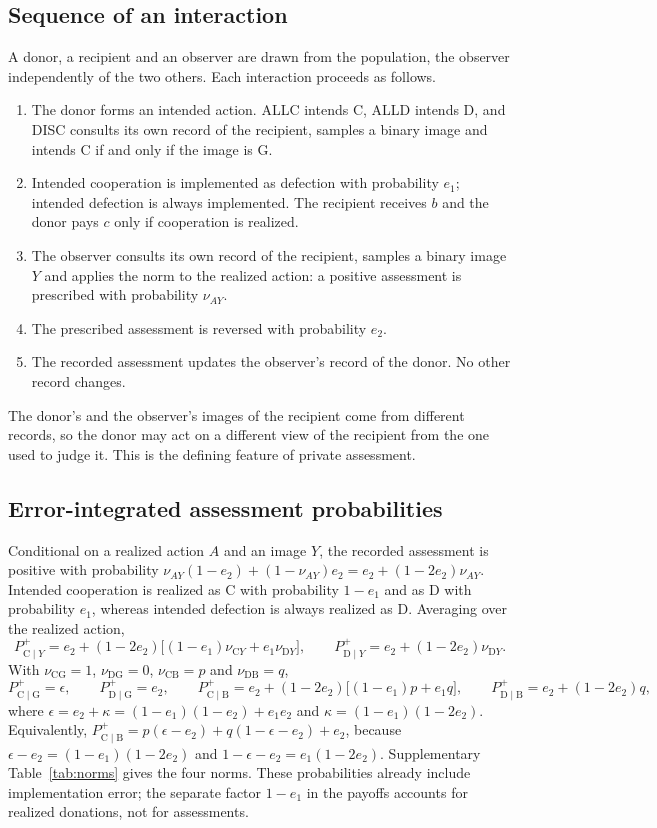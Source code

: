 \documentclass[fleqn,10pt]{article}
\theoremstyle{plain}
\theoremstyle{remark}
\newcommand{\G}{\mathrm G}
\newcommand{\B}{\mathrm B}
\newcommand{\C}{\mathrm C}
\newcommand{\D}{\mathrm D}
\newcommand{\Pp}[2]{P^+_{\mathrm{#1}\mid\mathrm{#2}}}
\begin{document}
\subsection{Sequence of an interaction}
A donor, a recipient and an observer are drawn from the population, the
observer independently of the two others. Each interaction proceeds as follows.
\begin{enumerate}
\item The donor forms an intended action. ALLC intends $\C$, ALLD intends $\D$,
and DISC consults its own record of the recipient, samples a binary image and
intends $\C$ if and only if the image is $\G$.
\item Intended cooperation is implemented as defection with probability $e_1$;
intended defection is always implemented. The recipient receives $b$ and the
donor pays $c$ only if cooperation is realized.
\item The observer consults its own record of the recipient, samples a binary
image $Y$ and applies the norm to the realized action: a positive assessment is
prescribed with probability $\nu_{AY}$.
\item The prescribed assessment is reversed with probability $e_2$.
\item The recorded assessment updates the observer's record of the donor. No
other record changes.
\end{enumerate}
The donor's and the observer's images of the recipient come from different
records, so the donor may act on a different view of the recipient from the
one used to judge it. This is the defining feature of private assessment.

\subsection{Error-integrated assessment probabilities}
Conditional on a realized action $A$ and an image $Y$, the recorded assessment
is positive with probability $\nu_{AY}(1-e_2)+(1-\nu_{AY})e_2=e_2+(1-2e_2)\nu_{AY}$.
Intended cooperation is realized as $\C$ with probability $1-e_1$ and as $\D$
with probability $e_1$, whereas intended defection is always realized as $\D$.
Averaging over the realized action,
\begin{equation}
P^+_{\C\mid Y}=e_2+(1-2e_2)\bigl[(1-e_1)\nu_{\C Y}+e_1\nu_{\D Y}\bigr],\qquad
P^+_{\D\mid Y}=e_2+(1-2e_2)\nu_{\D Y}.
\label{eq:S-assessment-general}
\end{equation}
With $\nu_{\C\G}=1$, $\nu_{\D\G}=0$, $\nu_{\C\B}=p$ and $\nu_{\D\B}=q$,
\begin{equation}
\Pp CG=\epsilon,\qquad \Pp DG=e_2,\qquad
\Pp CB=e_2+(1-2e_2)\bigl[(1-e_1)p+e_1q\bigr],\qquad
\Pp DB=e_2+(1-2e_2)q,
\label{eq:S-assessment}
\end{equation}
where $\epsilon=e_2+\kappa=(1-e_1)(1-e_2)+e_1e_2$ and
$\kappa=(1-e_1)(1-2e_2)$. Equivalently,
$\Pp CB=p(\epsilon-e_2)+q(1-\epsilon-e_2)+e_2$, because
$\epsilon-e_2=(1-e_1)(1-2e_2)$ and $1-\epsilon-e_2=e_1(1-2e_2)$. Supplementary
Table~\ref{tab:norms} gives the four norms. These probabilities already include
implementation error; the separate factor $1-e_1$ in the payoffs accounts for
realized donations, not for assessments.
\end{document}
